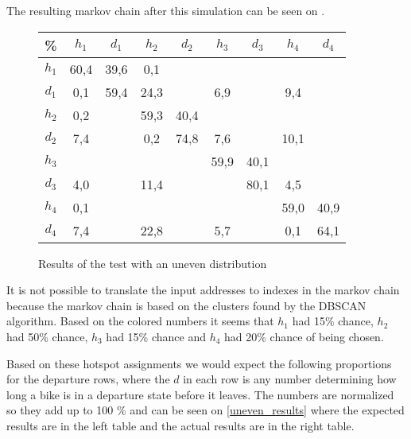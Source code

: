 The resulting markov chain after this simulation can be seen on .

\begin{figure}
	\centering
	\begin{tabular}{|c | c c c c c c c c|}
		\hline
		\% &      $ h_1 $ & $ d_1 $ & $ h_2 $ & $ d_2 $ & $ h_3 $ & $ d_3 $ & $ h_4 $ & $ d_4 $\\
		\hline
		$ h_1 $ & 60,4 &  39,6 &   0,1 &   &   &   &   &  \\
		$ d_1 $ & 0,1 &  59,4 &  {\color{red}24,3} &   &   {\color{red}6,9} &   &   {\color{red}9,4} &  \\
		$ h_2 $ & 0,2 &   &  59,3 &  40,4 &   &   &   &  \\
		$ d_2 $ & {\color{blue}7,4} &   &   0,2 &  74,8 &   {\color{blue}7,6} &   &  {\color{blue}10,1} &  \\
		$ h_3 $ & &   &   &   &  59,9 &  40,1 &   &  \\
		$ d_3 $ & {\color{orange}4,0} &   &  {\color{orange}11,4} &   &   &  80,1 &   {\color{orange}4,5} &  \\
		$ h_4 $ & 0,1 &   &   &   &   &   &  59,0 &  40,9\\
		$ d_4 $ & {\color{purple}7,4} &   &  {\color{purple}22,8} &   &   {\color{purple}5,7} &   &   0,1 &  64,1\\
		\hline
	\end{tabular}
	\caption{Results of the test with an uneven distribution}\label{test_uneven}
\end{figure}

It is not possible to translate the input addresses to indexes in the markov chain because the markov chain is based on the clusters found by the DBSCAN algorithm.
Based on the colored numbers it seems that $ h_1 $ had 15\% chance, $ h_2 $ had 50\% chance, $ h_3 $ had 15\% chance and $ h_4 $ had 20\% chance of being chosen.

Based on these hotspot assignments we would expect the following proportions for the departure rows, where the $ d $ in each row is any number determining how long a bike is in a departure state before it leaves.
The numbers are normalized so they add up to 100 \% and can be seen on \cref{uneven_results} where the expected results are in the left table and the actual results are in the right table.

